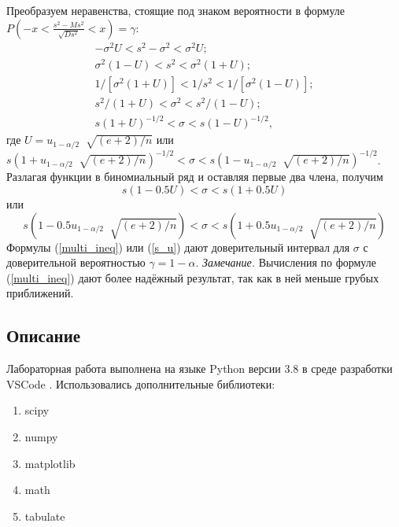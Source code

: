 \documentclass[a4paper]{article}
\begin{document}
    Преобразуем неравенства, стоящие под знаком вероятности в формуле
    \newline
    $P\left(-x < \frac{s^{2}-Ms^{2}}{\sqrt{D s^{2}}} < x\right) = \gamma$:
    \begin{equation}
        \begin{split}
            -\sigma^{2}U < s^{2} -\sigma^{2} < \sigma^{2}U; \\
           \sigma^{2}(1-U) < s^{2} < \sigma^{2}(1 + U); \\
            1/[\sigma^{2}(1 + U)] < 1/s^{2} < 1/[\sigma^{2}(1-U)];\\
            s^{2}/(1 + U) < \sigma^{2} < s^{2}/(1-U);\\
            s(1 + U)^{-1/2} < \sigma < s(1-U)^{-1/2},
        \end{split}
        \label{multi_ineq}
    \end{equation}
    где $U = u_{1-\alpha/2}︀\sqrt{(e + 2)/n}$ или
    \newline
    $s(1 +  u_{1-\alpha/2}︀\sqrt{(e + 2)/n})^{-1/2} <\sigma < s(1-u_{1-\alpha/2}︀\sqrt{(e + 2)/n})^{-1/2}$.
    \newline
    Разлагая функции в биномиальный ряд и оставляя первые два члена, получим
    \begin{equation}
        s(1-0.5U) < \sigma < s(1 + 0.5U)
        \label{s_U}
    \end{equation}
     или
    \begin{equation}
        s(1-0.5u_{1-\alpha/2}︀\sqrt{(e + 2)/n}) < \sigma < s(1 + 0.5 u_{1-\alpha/2}︀\sqrt{(e + 2)/n})
        \label{s_u}
    \end{equation}
    Формулы (\ref{multi_ineq}) или (\ref{s_u}) дают доверительный интервал для $\sigma$ с доверительной вероятностью $\gamma = 1-\alpha$. 
    \newline
    \textit{Замечание.} Вычисления по формуле (\ref{multi_ineq}) дают более надёжный результат, так как в ней меньше грубых приближений.
    
 
 \subsection{Описание}	
\noindent Лабораторная работа выполнена на языке Python версии 3.8 в среде разработки VSCode . Использовались дополнительные библиотеки:
\begin{enumerate}
    \item scipy
    \item numpy
    \item matplotlib
    \item math
    \item tabulate
\end{enumerate}
\end{document}
